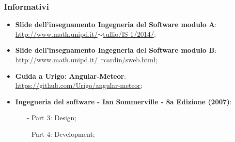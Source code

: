 \subsubsection{Informativi}
\begin{itemize}
	\item \textbf{Slide dell'insegnamento Ingegneria del Software modulo A}:\\ \href{http://www.math.unipd.it/~tullio/IS-1/2014/}{http://www.math.unipd.it/$\sim$tullio/IS-1/2014/};
	\item \textbf{Slide dell'insegnamento Ingegneria del Software modulo B}:\\ \href{http://www.math.unipd.it/~rcardin/sweb.html}{http://www.math.unipd.it/~rcardin/sweb.html};
	\item \textbf{Guida a Urigo: Angular-Meteor}: \\
\href{https://github.com/Urigo/angular-meteor}{https://github.com/Urigo/angular-meteor};
	\item \textbf{Ingegneria del software - Ian Sommerville - 8a Edizione (2007)}:
		\begin{itemize}
		\item[-] Part 3: Design;
		\item[-] Part 4: Development;
		\end{itemize}
\end{itemize}
	
	
